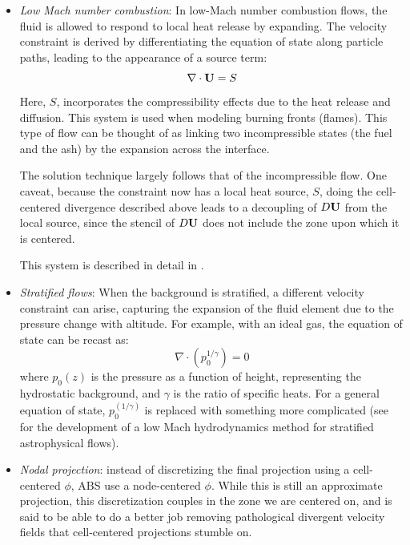 \begin{itemize}
\item {\em Low Mach number combustion}: In low-Mach number combustion
  flows, the fluid is allowed to respond to local heat release 
  by expanding.  The velocity constraint is derived by differentiating
  the equation of state along particle paths, leading to the appearance
  of a source term:
  \begin{equation}
  \nabla \cdot {\bf U} = S
  \end{equation}
  Here, $S$, incorporates the compressibility effects due to the 
  heat release and diffusion.  This system is used when modeling
  burning fronts (flames).  This type of flow can be thought
  of as linking two incompressible states (the fuel and the ash)
  by the expansion across the interface.

  The solution technique largely follows that of the incompressible
  flow.  One caveat, because the constraint now has a local heat
  source, $S$, doing the cell-centered divergence described above
  leads to a decoupling of $D{\bf U}$ from the local source, since the
  stencil of $D{\bf U}$ does not include the zone upon which it is centered.

  This system is described in detail in \cite{pember-flame,
    DayBell:2000,SNpaper}.

\item {\em Stratified flows}: When the background is stratified, a
  different velocity constraint can arise, capturing the expansion of
  the fluid element due to the pressure change with altitude.  For example,
  with an ideal gas, the equation of state can be recast as:
  \begin{equation}
  \nabla \cdot (p_0^{1/\gamma}) = 0
  \end{equation}
  where $p_0(z)$ is the pressure as a function of height,
  representing the hydrostatic background, and $\gamma$ is the ratio
  of specific heats.  For a general equation of state,
  $p_0^(1/\gamma)$ is replaced with something more complicated (see
  \cite{ABRZ:I,ABRZ:II,ABNZ:III} for the development of a low Mach
  hydrodynamics method for stratified astrophysical flows).

\item {\em Nodal projection}: instead of discretizing the final projection
  using a cell-centered $\phi$, ABS use a node-centered $\phi$.  While
  this is still an approximate projection, this discretization couples
  in the zone we are centered on, and is said to be able to do a better
  job removing pathological divergent velocity fields that cell-centered
  projections stumble on.

\end{itemize}



